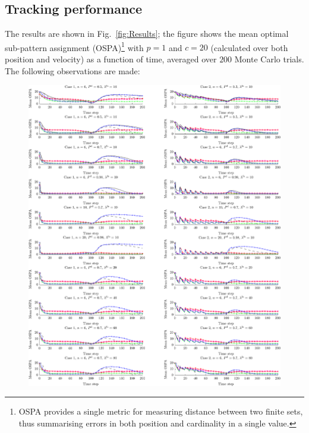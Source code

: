 \documentclass[journal,twoside]{IEEEtran}
\theoremstyle{plain}
\begin{document}
\subsection{Tracking performance}
\label{ss:ExpPerformance}
%
The results are shown in Fig.~\ref{fig:Results}; the figure shows the mean optimal sub-pattern assignment (OSPA)\footnote{OSPA provides a single metric for measuring distance between two finite sets, thus summarising errors in both position and cardinality in a single value.} \cite{SchVo08} with $p=1$ and $c=20$ (calculated over both position and velocity) as a function of time, averaged over $200$ Monte Carlo trials. The following observations are made:
%
\begin{figure}[p]
\centering
\ifCLASSOPTIONdraftcls
\includegraphics[width=6.5in]{figure5.pdf}
\else

\end{figure}
\end{document}
